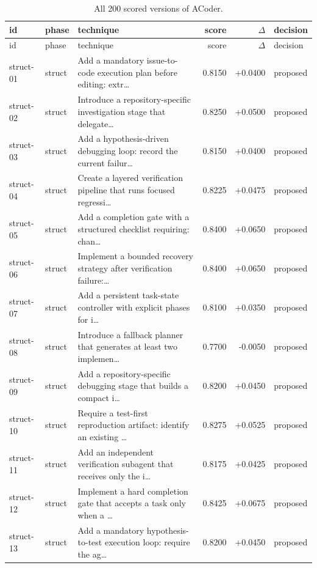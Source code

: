 \begin{center}\scriptsize\begin{longtable}{llp{5.2cm}rrl}
\caption{All 200 scored versions of ACoder.}\\
\toprule id & phase & technique & score & $\Delta$ & decision \\ \midrule \endfirsthead
\toprule id & phase & technique & score & $\Delta$ & decision \\ \midrule \endhead
struct-01 & struct & Add a mandatory issue-to-code execution plan before editing: extr\ldots{} & 0.8150 & +0.0400 & proposed \\
struct-02 & struct & Introduce a repository-specific investigation stage that delegate\ldots{} & 0.8250 & +0.0500 & proposed \\
struct-03 & struct & Add a hypothesis-driven debugging loop: record the current failur\ldots{} & 0.8150 & +0.0400 & proposed \\
struct-04 & struct & Create a layered verification pipeline that runs focused regressi\ldots{} & 0.8225 & +0.0475 & proposed \\
struct-05 & struct & Add a completion gate with a structured checklist requiring: chan\ldots{} & 0.8400 & +0.0650 & proposed \\
struct-06 & struct & Implement a bounded recovery strategy after verification failure:\ldots{} & 0.8400 & +0.0650 & proposed \\
struct-07 & struct & Add a persistent task-state controller with explicit phases for i\ldots{} & 0.8100 & +0.0350 & proposed \\
struct-08 & struct & Introduce a fallback planner that generates at least two implemen\ldots{} & 0.7700 & -0.0050 & proposed \\
struct-09 & struct & Add a repository-specific debugging stage that builds a compact i\ldots{} & 0.8200 & +0.0450 & proposed \\
struct-10 & struct & Require a test-first reproduction artifact: identify an existing \ldots{} & 0.8275 & +0.0525 & proposed \\
struct-11 & struct & Add an independent verification subagent that receives only the i\ldots{} & 0.8175 & +0.0425 & proposed \\
struct-12 & struct & Implement a hard completion gate that accepts a task only when a \ldots{} & 0.8425 & +0.0675 & proposed \\
struct-13 & struct & Add a mandatory hypothesis-to-test execution loop: require the ag\ldots{} & 0.8200 & +0.0450 & proposed \\

\end{longtable}
\end{center}
